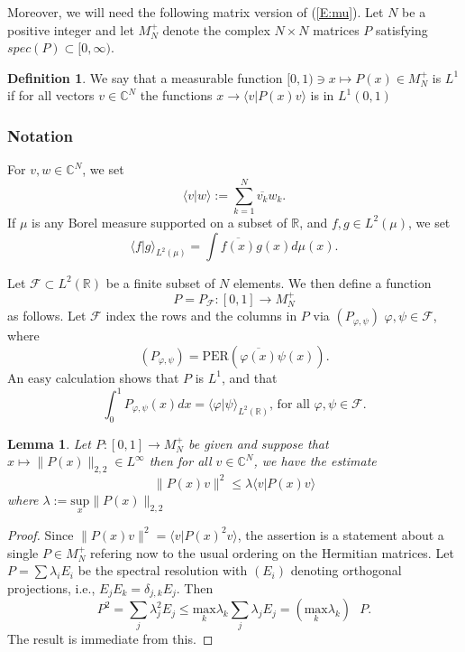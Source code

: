 \documentclass{birkmult}
\newtheorem{lem}[thm]{Lemma}
\theoremstyle{definition}
\newtheorem{defn}[thm]{Definition}
\theoremstyle{remark}
\numberwithin{equation}{section}
\begin{document}
Moreover, we will need the following matrix version of (\ref{E:mu}).  Let 
$N$ be a positive integer and let $M_{N}^{+}$ denote the complex $N \times N$
matrices $P$ satisfying $spec(P) \subset [0, \infty)$.

\begin{defn}
We say that a measurable function $[0,1) \ni x \mapsto P(x) \in M_{N}^{+}$ is
$L^{1}$ if for all vectors $v \in \mathbb{C}^{N}$ the functions 
$x \to \langle v | P(x) v \rangle$ is in $L^{1}(0,1)$
\end{defn}

\subsubsection*{Notation} For $v, w \in \mathbb{C}^{N}$, we set 
\[
  \langle v | w \rangle := \sum_{k=1}^{N} \overline{v_{k}}w_{k}.
\]
If $\mu$ is any Borel measure supported on a subset of $\mathbb{R}$, and 
$f, g \in L^{2}(\mu)$, we set 
\[
  \langle f | g \rangle_{L^{2}(\mu)}= \int \overline{f(x)}g(x)d\mu (x).
\]

Let $\mathcal{F} \subset L^{2}(\mathbb{R})$ be a finite subset of $N$ 
elements.  We then define a function 
\[
  P=P_{\mathcal{F}}:[0,1] \to M_{N}^{+}
\]
as follows.  Let $\mathcal{F}$ index the rows and the columns in $P$ via
$(P_{\varphi, \psi})$ $\varphi, \psi \in \mathcal{F}$, where 
\[
  (P_{\varphi, \psi})=\text{PER}(\overline{\varphi(x)}\psi(x)).
\]
An easy calculation shows that $P$ is $L^{1}$, and that 
\[
  \int_{0}^{1} P_{\varphi, \psi}(x)dx 
  = \langle \varphi | \psi \rangle_{L^{2}(\mathbb{R})}
  \text{, for all } \varphi, \psi \in \mathcal{F}.
\]

\begin{lem}
\label{L:2.2}
Let $P:[0,1] \to M_{N}^{+}$ be given and suppose that 
$x \mapsto \|P(x)\|_{2,2} \in L^{\infty}$ then for all 
$v \in \mathbb{C}^{N}$, we have the estimate 
\[
  \|P(x)v\|^{2} \leq \lambda \langle v | P(x)v \rangle
\] where $\lambda := \underset{x}{\text{sup}} \|P(x)\|_{2,2}$
\end{lem}
\begin{proof}
Since $ \|P(x)v\|^{2} = \langle v | P(x)^{2}v \rangle$, the assertion
is a statement about a single $P \in M_{N}^{+}$ refering now to the usual
ordering on the Hermitian matrices.  Let $P=\sum \lambda_{i}E_{i}$ be the
spectral resolution with $(E_{i})$ denoting orthogonal projections,
i.e., $E_{j}E_{k}=\delta_{j,k}E_{j}$.  Then 
\[
  P^{2}=\sum_{j}\lambda_{j}^{2}E_{j} \leq 
  \underset{k}{\text{max}} \lambda_{k} \sum_{j} \lambda_{j}E_{j} 
  = (\underset{k}{\text{max}} \lambda_{k}) \text{ } P.
\]
The result is immediate from this.
\end{proof}
\end{document}
